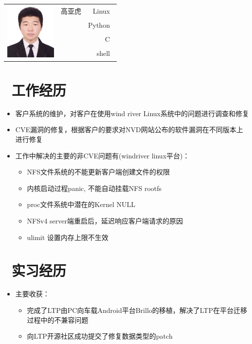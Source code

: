 \documentclass{resume}
\begin{document}
\Large{
  \begin{tabu}{ c l r }
     & \scshape{高亚虎} & {Linux~} \\
    &  & {Python~} \\
    &  & {C~} \\
    &  & {shell~}
  \end{tabu}
}

\section{\faUsers\ 工作经历}
\begin{itemize}
    \item {客户系统的维护，对客户在使用wind river Linux系统中的问题进行调查和修复}    
	\item {CVE漏洞的修复，根据客户的要求对NVD网站公布的软件漏洞在不同版本上进行修复}
    \item {工作中解决的主要的非CVE问题有(windriver linux平台)：}
    \begin{itemize}
        \item {NFS文件系统的不能更新客户端创建文件的权限}
        \item {内核启动过程panic, 不能自动挂载NFS rootfs}
        \item {proc文件系统中潜在的Kernel NULL}
        \item {NFSv4 server端重启后，延迟响应客户端请求的原因}
        \item {ulimit 设置内存上限不生效}
    \end{itemize}
\end{itemize}

\section{\faUsers\ 实习经历}
\begin{itemize}
    \item {主要收获：}
    \begin{itemize}
        \item {完成了LTP由PC向车载Android平台Brillo的移植，解决了LTP在平台迁移过程中的不兼容问题}
        \item {向LTP开源社区成功提交了修复数据类型的patch}
    \end{itemize}
\end{itemize}
\end{document}

